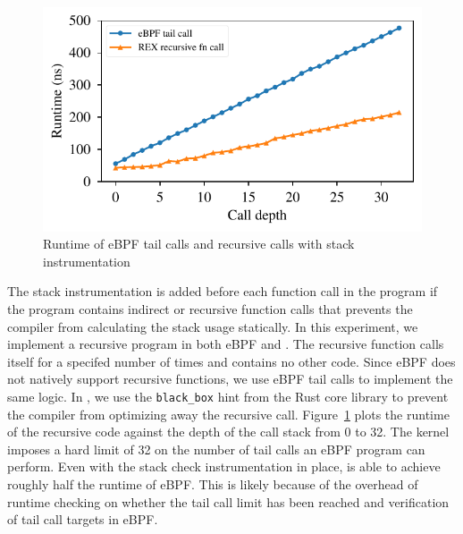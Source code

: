 \begin{figure}[t]
    \includegraphics[width=1.0\linewidth]{figs/recursive.pdf}
    \centering
    \vspace{-25pt}
    \caption{Runtime of eBPF tail calls and \projname{} recursive calls with
    stack instrumentation}
    \label{fig:eval-recursion}
    \vspace{-10pt}
\end{figure}
The stack instrumentation is added before each
    function call in the \projname{} program if the program contains indirect
    or recursive function calls that prevents the compiler from calculating the
    stack usage statically.
In this experiment, we implement a recursive program in both
    eBPF and \projname{}.
The recursive function calls itself for a specifed number of times and contains
    no other code.
Since eBPF does not natively support recursive functions, we use eBPF tail
    calls to implement the same logic.
In \projname{}, we use the \texttt{black\_box} hint from the Rust core library
    to prevent the compiler from optimizing away the recursive call.
Figure~\ref{fig:eval-recursion} plots the runtime of the recursive code against
    the depth of the call stack from 0 to 32.
The kernel imposes a hard limit of 32 on the number of tail calls an eBPF
    program can perform.
Even with the stack check instrumentation in place, \projname{} is able to
    achieve roughly half the runtime of eBPF.
This is likely because of the overhead of runtime checking on whether the tail
    call limit has been reached and verification of tail call targets in eBPF.